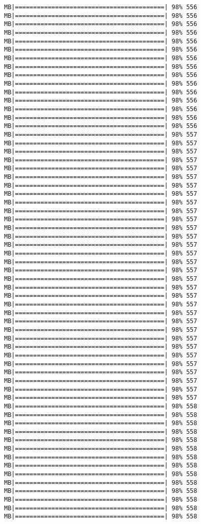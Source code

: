 \documentclass[
]{article}
\begin{document}
\begin{verbatim}
MB|=========================================| 98% 556 MB|=========================================| 98% 556 MB|=========================================| 98% 556 MB|=========================================| 98% 556 MB|=========================================| 98% 556 MB|=========================================| 98% 556 MB|=========================================| 98% 556 MB|=========================================| 98% 556 MB|=========================================| 98% 556 MB|=========================================| 98% 556 MB|=========================================| 98% 556 MB|=========================================| 98% 556 MB|=========================================| 98% 556 MB|=========================================| 98% 556 MB|=========================================| 98% 556 MB|=========================================| 98% 557 MB|=========================================| 98% 557 MB|=========================================| 98% 557 MB|=========================================| 98% 557 MB|=========================================| 98% 557 MB|=========================================| 98% 557 MB|=========================================| 98% 557 MB|=========================================| 98% 557 MB|=========================================| 98% 557 MB|=========================================| 98% 557 MB|=========================================| 98% 557 MB|=========================================| 98% 557 MB|=========================================| 98% 557 MB|=========================================| 98% 557 MB|=========================================| 98% 557 MB|=========================================| 98% 557 MB|=========================================| 98% 557 MB|=========================================| 98% 557 MB|=========================================| 98% 557 MB|=========================================| 98% 557 MB|=========================================| 98% 557 MB|=========================================| 98% 557 MB|=========================================| 98% 557 MB|=========================================| 98% 557 MB|=========================================| 98% 557 MB|=========================================| 98% 557 MB|=========================================| 98% 557 MB|=========================================| 98% 557 MB|=========================================| 98% 557 MB|=========================================| 98% 557 MB|=========================================| 98% 557 MB|=========================================| 98% 557 MB|=========================================| 98% 558 MB|=========================================| 98% 558 MB|=========================================| 98% 558 MB|=========================================| 98% 558 MB|=========================================| 98% 558 MB|=========================================| 98% 558 MB|=========================================| 98% 558 MB|=========================================| 98% 558 MB|=========================================| 98% 558 MB|=========================================| 98% 558 MB|=========================================| 98% 558 MB|=========================================| 98% 558 MB|=========================================| 98% 558 MB|=========================================| 98% 558 
\end{verbatim}
\end{document}
